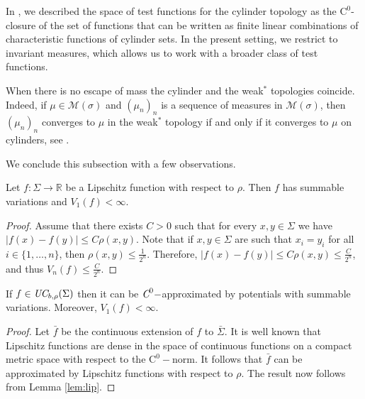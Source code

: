 \documentclass[letterpaper,11pt]{amsart}
\numberwithin{equation}{section}     %
\newcommand{\R}{\mathbb{R}}
\def\R{{\mathbb R}}
\def\le{\leqslant}
\begin{document}
\begin{remark}In \cite[Lemma 3.19]{iv}, we described the space of test functions for the cylinder topology as the $\text{C}^0$-closure of the set of functions that can be written as finite linear combinations of characteristic functions of cylinder sets. In the present setting, we restrict to invariant measures, which allows us to work with a broader class of test functions.\end{remark}


\begin{remark} \label{rem:weak=cyl}  When there is no escape of mass the cylinder and the weak$^*$ topologies coincide. Indeed, if $\mu \in \mathcal{M}(\sigma)$ and $(\mu_n)_n$ is a sequence of measures in $\mathcal{M}(\sigma)$, then $(\mu_n)_n$ converges to $\mu$ in the weak$^*$ topology if and only if it converges to $\mu$ on cylinders, see \cite[Lemma 3.17]{iv}.
\end{remark}





We conclude this subsection with a few observations.

\begin{lemma}\label{lem:lip}
Let $f : \Sigma \to \R$ be a Lipschitz function with respect to $\rho$. Then $f$ has summable variations and $V_1(f)<\infty$.
\end{lemma}

\begin{proof}
Assume that there exists $C>0$ such that for every $x,y\in\Sigma$ we have $|f(x)-f(y)|\le C\rho(x,y)$.  Note that if $x, y \in \Sigma$ are such that $x_i = y_i$ for all $i \in \{1, \ldots, n\}$, then $\rho(x, y) \le \frac{1}{2^n}$. Therefore, $|f(x)-f(y)|\le C\rho(x,y)\le \frac{C}{2^n}$, and thus $V_n(f)\le \frac{C}{2^n}$. 
\end{proof}

\begin{lemma}\label{lem:appr} If $f\in \emph{UC}_{b,\rho}(\Sigma)$ then it can be $\emph{C}^0-$approximated by potentials with summable variations. Moreover, $V_1(f)<\infty$. 
\end{lemma}

\begin{proof} Let $\bar{f}$ be the continuous extension of $f$ to $\bar{\Sigma}$. It is well known that Lipschitz functions are dense in the space of continuous functions on a compact metric space with respect to the $\text{C}^0-$norm. It follows that $\bar{f}$ can be approximated by Lipschitz functions with respect to $\rho$. The result now follows from Lemma \ref{lem:lip}.
\end{proof}
\end{document}
